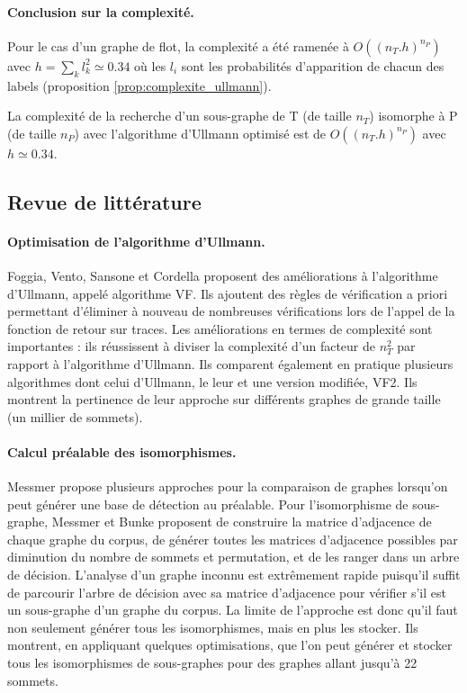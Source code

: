 \paragraph{Conclusion sur la complexité.} 
Pour le cas d'un graphe de flot, la complexité a été ramenée à $O((n_T.h)^{n_P})$ avec $h=\sum_kl_k^2\simeq 0.34$ où les $l_i$ sont les probabilités d'apparition de chacun des labels (proposition \ref{prop:complexite_ullmann}).

\begin{prop}
La complexité de la recherche d'un sous-graphe de T (de taille $n_T$) isomorphe à P (de taille $n_P$) avec l'algorithme d'Ullmann optimisé est de $O((n_T.h)^{n_P})$ avec $h\simeq 0.34$.
\label{prop:complexite_ullmann}
\end{prop}

\subsection{Revue de littérature}
\paragraph{Optimisation de l'algorithme d'Ullmann.}
Foggia, Vento, Sansone et Cordella \cite{VF99} proposent des améliorations à l'algorithme d'Ullmann, appelé algorithme VF.
Ils ajoutent des règles de vérification a priori permettant d'éliminer à nouveau de nombreuses vérifications lors de l'appel de la fonction de retour sur traces.
Les améliorations en termes de complexité sont importantes : ils réussissent à diviser la complexité d'un facteur de $n_T^2$ par rapport à l'algorithme d'Ullmann.
Ils comparent également en pratique plusieurs algorithmes \cite{FSV01} dont celui d'Ullmann, le leur et une version modifiée, VF2. Ils montrent la pertinence de leur approche sur différents graphes de grande taille (un millier de sommets).

\paragraph{Calcul préalable des isomorphismes.}
Messmer \cite{MessPhd} propose plusieurs approches pour la comparaison de graphes lorsqu'on peut générer une base de détection au préalable.
Pour l'isomorphisme de sous-graphe, Messmer et Bunke proposent \cite{MB95} de construire la matrice d'adjacence de chaque graphe du corpus, de générer toutes les matrices d'adjacence possibles par diminution du nombre de sommets et permutation, et de les ranger dans un arbre de décision.
L'analyse d'un graphe inconnu est extrêmement rapide puisqu'il suffit de parcourir l'arbre de décision avec sa matrice d'adjacence pour vérifier s'il est un sous-graphe d'un graphe du corpus.
La limite de l'approche est donc qu'il faut non seulement générer tous les isomorphismes, mais en plus les stocker.
Ils montrent, en appliquant quelques optimisations, que l'on peut générer et stocker tous les isomorphismes de sous-graphes pour des graphes allant jusqu'à 22 sommets.
\\

